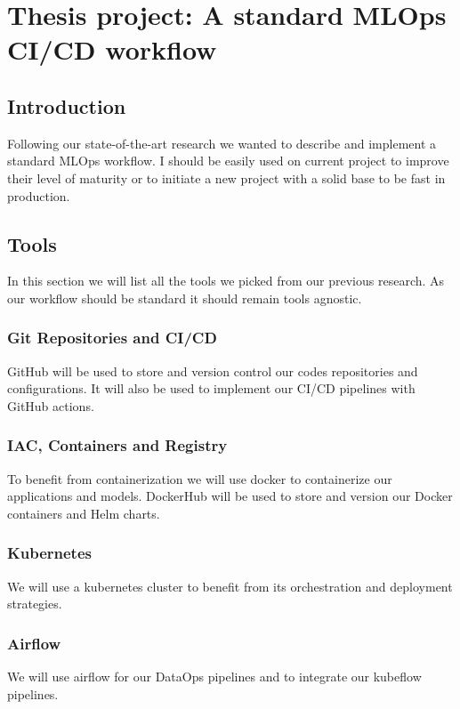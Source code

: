 \chapter{Thesis project: A standard MLOps CI/CD workflow}\label{ch:thesis-project:-a-standard-mlops-ci/cd-workflow}
\section{Introduction}\label{sec:introduction}
Following our state-of-the-art research we wanted to describe and implement a standard MLOps workflow.
I should be easily used on current project to improve their level of maturity or to initiate a new project with a solid
base to be fast in production.

\section{Tools}\label{sec:tools2}
In this section we will list all the tools we picked from our previous research.
As our workflow should be standard it should remain tools agnostic.

\subsection{Git Repositories and CI/CD}\label{subsec:github}
GitHub will be used to store and version control our codes repositories and configurations.
It will also be used to implement our CI/CD pipelines with GitHub actions.

\subsection{IAC, Containers and Registry}\label{subsec:dockerhub}
To benefit from containerization we will use docker to containerize our applications and models.
DockerHub will be used to store and version our Docker containers and Helm charts.

\subsection{Kubernetes}\label{subsec:kubernetes}
We will use a kubernetes cluster to benefit from its orchestration and deployment strategies.

\subsection{Airflow}\label{subsec:airflow}
We will use airflow for our DataOps pipelines and to integrate our kubeflow pipelines.

